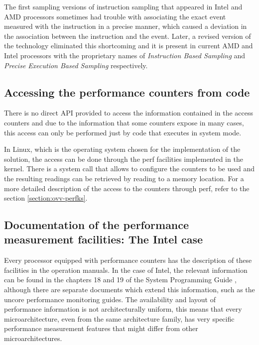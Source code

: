 The first sampling versions of instruction sampling that appeared in Intel and AMD processors sometimes had trouble with associating the exact event measured with the instruction in a precise manner, which caused a deviation in the association between the instruction and the event. Later, a revised version of the technology eliminated this shortcoming and it is present in current AMD and Intel processors with the proprietary names of \textit{Instruction Based Sampling} \cite{amd-ibs} and \textit{Precise Execution Based Sampling}  respectively. 

\subsection{Accessing the performance counters from code}\label{subsection:accessing-code}

There is no direct API provided to access the information contained in the access counters and due to the information that some counters expose in many cases, this access can only be performed just by code that executes in system mode.

In Linux, which is the operating system chosen for the implementation of the solution, the access can be done through the perf facilities implemented in the kernel. There is a system call that allows to configure the counters to be used and the resulting readings can be retrieved by reading to a memory location. For a more detailed description of the access to the counters through perf, refer to the section \ref{section:ovv-perfks}. 

\subsection{Documentation of the performance measurement facilities: The Intel case }\label{subsection:performance-documentation}

Every processor equipped with performance counters has the description of these facilities in the operation manuals. In the case of Intel, the relevant information can be found in the chapters 18 and 19 of the System Programming Guide \cite{intel-devguide}, although there are separate documents which extend this information, such as the uncore performance monitoring guides. The availability and layout of performance information is not architecturally uniform, this means that every microarchitecture, even from the same architecture family, has very specific performance measurement features that might differ from other microarchitectures.


